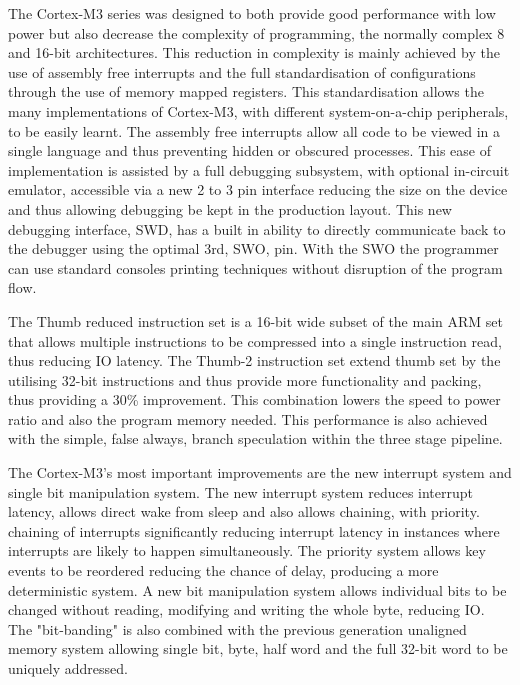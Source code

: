 The Cortex-M3 series was designed to both provide good performance with low power but also
decrease the complexity of programming, the normally complex 8 and 16-bit architectures. This
reduction in complexity is mainly achieved by the use of assembly free interrupts and the full
standardisation of configurations through the use of memory mapped registers. This standardisation
allows the many implementations of Cortex-M3, with different system-on-a-chip peripherals, to be
easily learnt. The assembly free interrupts allow all code to be viewed in a single language and thus
preventing hidden or obscured processes. This ease of implementation is assisted by a full debugging
subsystem, with optional in-circuit emulator, accessible via a new 2 to 3 pin interface reducing the
size on the device and thus allowing debugging be kept in the production layout. This new debugging
interface, \ac{SWD}, has a built in ability to directly communicate back to the
debugger using the optimal 3rd, \ac{SWO}, pin. With the \ac{SWO} the programmer can use
standard consoles printing techniques without disruption of the program flow.


The Thumb reduced instruction set is a 16-bit wide subset of the main ARM set that allows multiple
instructions to be compressed into a single instruction read, thus reducing \ac{IO} latency. The Thumb-2
instruction set extend thumb set by the utilising 32-bit instructions and thus provide more
functionality and packing, thus providing a 30\% improvement. This combination lowers the speed to
power ratio and also the program memory needed. This performance is also achieved with the
simple, false always, branch speculation within the three stage pipeline.


The Cortex-M3's most important improvements are the new interrupt system and single bit
manipulation system. The new interrupt system reduces interrupt latency, allows direct wake from
sleep and also allows chaining, with priority. chaining of interrupts significantly reducing interrupt
latency in instances where interrupts are likely to happen simultaneously. The priority system allows
key events to be reordered reducing the chance of delay, producing a more deterministic system. A
new bit manipulation system allows individual bits to be changed without reading, modifying and
writing the whole byte, reducing \ac{IO}. The "bit-banding" is also combined with the previous
generation unaligned memory system allowing single bit, byte, half word and the full 32-bit word to
be uniquely addressed.


